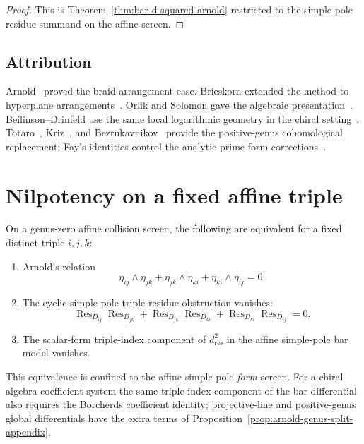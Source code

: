 \begin{proof}
This is Theorem~\ref{thm:bar-d-squared-arnold} restricted to the
simple-pole residue summand on the affine screen.
\end{proof}

\subsection{Attribution}

Arnold~\cite{Arnold69} proved the braid-arrangement case. Brieskorn
extended the method to hyperplane arrangements~\cite{Brieskorn73}.
Orlik and Solomon gave the algebraic presentation~\cite{OS80}.
Beilinson--Drinfeld use the same local logarithmic geometry in the
chiral setting~\cite{BD04}. Totaro~\cite{Totaro96},
Kriz~\cite{Kriz94}, and Bezrukavnikov~\cite{Bezrukavnikov94} provide
the positive-genus cohomological replacement; Fay's identities
control the analytic prime-form corrections~\cite{Fay73}.

\section{Nilpotency on a fixed affine triple}
\label{sec:arnold-in-bar-nilpotency}

\begin{theorem}\label{thm:arnold-iff-nilpotent}
On a genus-zero affine collision screen, the following are equivalent
for a fixed distinct triple \(i,j,k\):
\begin{enumerate}
\item Arnold's relation
\[
\eta_{ij}\wedge\eta_{jk}
+\eta_{jk}\wedge\eta_{ki}
+\eta_{ki}\wedge\eta_{ij}=0.
\]
\item The cyclic simple-pole triple-residue obstruction vanishes:
\[
\operatorname{Res}_{D_{ij}}\operatorname{Res}_{D_{jk}}
+\operatorname{Res}_{D_{jk}}\operatorname{Res}_{D_{ki}}
+\operatorname{Res}_{D_{ki}}\operatorname{Res}_{D_{ij}}=0.
\]
\item The scalar-form triple-index component of \(d_{\mathrm{res}}^2\)
in the affine simple-pole bar model vanishes.
\end{enumerate}
This equivalence is confined to the affine simple-pole \emph{form}
screen. For a chiral algebra coefficient system the same triple-index
component of the bar differential also requires the Borcherds
coefficient identity; projective-line and positive-genus global
differentials have the extra terms of
Proposition~\ref{prop:arnold-genus-split-appendix}.
\end{theorem}

